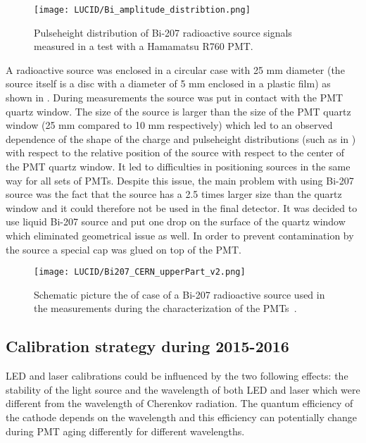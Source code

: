 \begin{figure}
\centering
\texttt{[image: LUCID/Bi\_amplitude\_distribtion.png]}
\caption{Pulseheight distribution of Bi-207 radioactive source signals measured in a test with a Hamamatsu R760 PMT.}
\label{fig:pulseheight_Bi207}
\end{figure}

A radioactive source was enclosed in a circular case with 25 mm diameter 
(the source itself is a disc with a diameter of 5 mm enclosed in a plastic film) as shown in .
During measurements the source was put in contact with the PMT quartz window.
The size of the source is larger than the size of the PMT quartz window (25 mm compared to 10 mm respectively) which led to an observed dependence of the shape of the charge and pulseheight distributions (such as in ) with respect to the relative position of the source 
with respect to the center of the PMT quartz window.
It led to difficulties in positioning sources in the same way for all sets of PMTs.
Despite this issue, the main problem with using Bi-207 source was the fact that the source has a 2.5 times larger size than the quartz window
and it could therefore not be used in the final detector.
It was decided to use liquid Bi-207 source and put one drop on the surface of the quartz window which eliminated geometrical issue as well.
In order to prevent contamination by the source a special cap was glued on top of the PMT.
 
\begin{figure}
\centering
\texttt{[image: LUCID/Bi207\_CERN\_upperPart\_v2.png]}
\caption{Schematic picture the of case of a Bi-207 radioactive source used in the measurements during the characterization of the PMTs~\cite{Alberghi:2016tad}.}
\label{fig:Bi207_case}
\end{figure}

\subsection{Calibration strategy during 2015-2016}
\label{subsec:calibPerformance}

LED and laser calibrations could be influenced by the two following effects:
the stability of the light source and the wavelength of both LED and laser which were different from the wavelength of Cherenkov radiation. 
The quantum efficiency of the cathode depends on the wavelength and this efficiency can potentially change during PMT aging
differently for different wavelengths.

